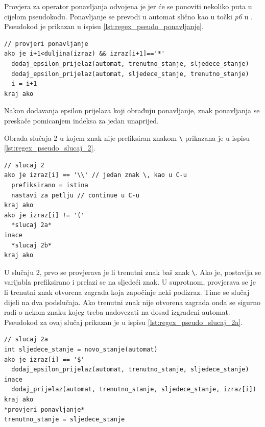 \documentclass[times, 12pt, utf8]{book}
\begin{document}
Provjera za operator ponavljanja odvojena je jer će se ponoviti nekoliko puta u cijelom pseudokodu.
Ponavljanje se prevodi u automat slično kao u točki \emph{p6} u \cite[poglavlje 2.2.2]{utr}.
Pseudokod je prikazan u ispisu \ref{lst:regex_pseudo_ponavljanje}.

\begin{lstlisting}[caption={Obrada ponavljanja Kleenovim operatorom.},label=lst:regex_pseudo_ponavljanje]
// provjeri ponavljanje
ako je i+1<duljina(izraz) && izraz[i+1]=='*'
  dodaj_epsilon_prijelaz(automat, trenutno_stanje, sljedece_stanje)
  dodaj_epsilon_prijelaz(automat, sljedece_stanje, trenutno_stanje)
  i = i+1
kraj ako
\end{lstlisting}

Nakon dodavanja epsilon prijelaza koji obrađuju ponavljanje, znak ponavljanja se preskače pomicanjem indeksa za jedan unaprijed.

Obrada slučaja 2 u kojem znak nije prefiksiran znakom \verb|\| prikazana je u ispisu \ref{lst:regex_pseudo_slucaj_2}.

\begin{lstlisting}[caption={Slučaj 2 u funkciji \texttt{pretvori}.},label=lst:regex_pseudo_slucaj_2]
// slucaj 2
ako je izraz[i] == '\\' // jedan znak \, kao u C-u
  prefiksirano = istina
  nastavi za petlju // continue u C-u
kraj ako
ako je izraz[i] != '('
  *slucaj 2a*
inace
  *slucaj 2b*
kraj ako
\end{lstlisting}

U slučaju 2, prvo se provjerava je li trenutni znak baš znak \verb|\|.
Ako je, postavlja se varijabla prefiksirano i prelazi se na sljedeći znak.
U suprotnom, provjerava se je li trenutni znak otvorena zagrada koja započinje neki podizraz.
Time se slučaj dijeli na dva podslučaja.
Ako trenutni znak nije otvorena zagrada onda se sigurno radi o nekom znaku kojeg treba nadovezati na dosad izgrađeni automat.
Pseudokod za ovaj slučaj prikazan je u ispisu \ref{lst:regex_pseudo_slucaj_2a}.

\begin{lstlisting}[caption={Slučaj 2a u funkciji \texttt{pretvori}.},label=lst:regex_pseudo_slucaj_2a]
// slucaj 2a
int sljedece_stanje = novo_stanje(automat)
ako je izraz[i] == '$'
  dodaj_epsilon_prijelaz(automat, trenutno_stanje, sljedece_stanje)
inace
  dodaj_prijelaz(automat, trenutno_stanje, sljedece_stanje, izraz[i])
kraj ako
*provjeri ponavljanje*
trenutno_stanje = sljedece_stanje
\end{lstlisting}
\end{document}
